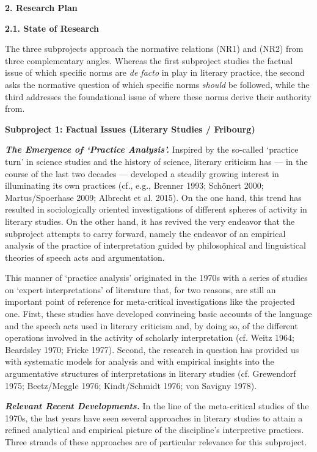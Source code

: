 \noindent\textbf{\large 2.  Research Plan}

\noindent\textbf{2.1.  State of Research}

\noindent The three subprojects approach the normative relations (NR1) and (NR2) from three complementary angles. Whereas the first subproject studies the factual issue of which specific norms are \emph{de facto} in play in literary practice, the second asks the normative question of which specific norms \emph{should} be followed, while the third addresses the foundational issue of where these norms derive their authority from.

\vspace{.2cm}
\noindent\textbf{Subproject 1: Factual Issues (Literary Studies / Fribourg)}
\vspace{.2cm}

\noindent \textbf{\emph{The Emergence of `Practice Analysis'.}} Inspired by the so-called `practice turn' in science studies and the history of science, literary criticism has --- in the course of the last two decades --- developed a steadily growing interest in illuminating its own practices (cf., e.g., Brenner 1993; Sch\"onert 2000; Martus/Spoerhase 2009; Albrecht et al. 2015). On the one hand, this trend has resulted in sociologically oriented investigations of different spheres of activity in literary studies. On the other hand, it has revived the very endeavor that the subproject attempts to carry forward, namely the endeavor of an empirical analysis of the practice of interpretation guided by philosophical and linguistical theories of speech acts and argumentation. 

This manner of `practice analysis' originated in the 1970s with a series of studies on `expert interpretations' of literature that, for two reasons, are still an important point of reference for meta-critical investigations like the projected one. First, these studies have developed convincing basic accounts of the language and the speech acts used in literary criticism and, by doing so, of the different operations involved in the activity of scholarly interpretation (cf. Weitz 1964; Beardsley 1970; Fricke 1977). Second, the research in question has provided us with systematic models for analysis and with empirical insights into the argumentative structures of interpretations in literary studies (cf. Grewendorf 1975; Beetz/Meggle 1976; Kindt/Schmidt 1976; von Savigny 1978). 

\vspace{.2cm}
\noindent \textbf{\emph{Relevant Recent Developments.}} In the line of the meta-critical studies of the 1970s, the last years have seen several approaches in literary studies to attain a refined analytical and empirical picture of the discipline's interpretive practices. Three strands of these approaches are of particular relevance for this subproject. 

